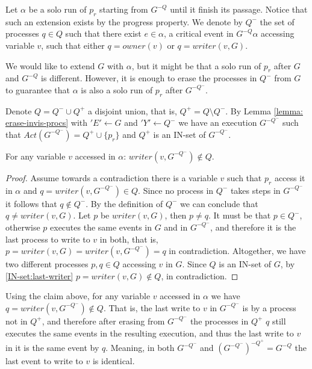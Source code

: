 Let $\alpha$ be a solo run of $p_r$ starting from $G^{-Q}$ until it finish its passage. Notice that such an extension exists by the progress property. We denote by $Q^-$ the set of processes $q \in Q$ such that there exist $e \in \alpha$, a critical event in $G^{-Q} \alpha$ accessing variable $v$, such that either $q = owner(v)$ or $q = writer(v,G)$.

We would like to extend $G$ with $\alpha$, but it might be that a solo run of $p_r$ after $G$ and $G^{-Q}$ is different. However, it is enough to erase the processes in $Q^-$ from $G$ to guarantee that $\alpha$ is also a solo run of $p_r$ after $G^{-Q^-}$.

Denote $Q = Q^- \cup Q^+$ a disjoint union, that is, $Q^+ = Q \setminus Q^-$. By Lemma \ref{lemma: erase-invis-procs} with $'E' \leftarrow G$ and $'Y' \leftarrow Q^-$ we have an execution $G^{-Q^-}$ such that $Act(G^{-Q^-}) = Q^+ \cup \{p_r\}$ and $Q^+$ is an IN-set of $G^{-Q^-}$.


\begin{claim-subsection} \label{claim: v-access-in-alpha}
	For any variable $v$ accessed in $\alpha$: $writer(v,G^{-Q^-}) \notin Q$.
\end{claim-subsection}

\begin{proof}
	Assume towards a contradiction there is a variable $v$ such that $p_r$ access it in $\alpha$ and $q = writer(v,G^{-Q^-}) \in Q$. Since no process in $Q^-$ takes steps in $G^{-Q^-}$ it follows that $q \notin Q^-$. By the definition of $Q^-$ we can conclude that $q \neq writer(v,G)$. Let $p$ be $writer(v,G)$, then $p \neq q$. It must be that $p \in Q^-$, otherwise $p$ executes the same events in $G$ and in $G^{-Q^-}$, and therefore it is the last process to write to $v$ in both, that is, $p = writer(v,G) = writer(v,G^{-Q^-}) = q$ in contradiction.
	Altogether, we have two different processes $p,q \in Q$ accessing $v$ in $G$. Since $Q$ is an IN-set of $G$, by \ref{IN-set:last-writer} $p = writer(v,G) \notin Q$, in contradiction.
\end{proof}

Using the claim above, for any variable $v$ accessed in $\alpha$ we have $q = writer(v,G^{-Q^-}) \notin Q$. That is, the last write to $v$ in $G^{-Q^-}$ is by a process not in $Q^+$, and therefore after erasing from $G^{-Q^-}$ the processes in $Q^+$ $q$ still executes the same events in the resulting execution, and thus the last write to $v$ in it is the same event by $q$. Meaning, in both $G^{-Q^-}$ and $(G^{-Q^-})^{-Q^+} = G^{-Q}$ the last event to write to $v$ is identical.

